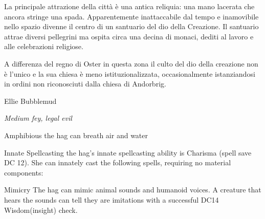 \documentclass[10pt,twoside, twocolumn, openany]{dndbook}
\begin{document}
La principale attrazione della città è una antica reliquia: una mano lacerata che ancora stringe una spada. Apparentemente inattaccabile dal tempo e inamovibile nello spazio divenne il centro di un santuario del dio della Creazione.
Il santuario attrae diversi pellegrini ma ospita circa una decina di monaci, dediti al lavoro e alle celebrazioni religiose.

A differenza del regno di Oster in questa zona il culto del dio della creazione non è l'unico e la sua chiesa è meno istituzionalizzata, occasionalmente istanziandosi in ordini non riconosciuti dalla chiesa di Andorbrig.


\begin{DndMonster}{Ellie Bubblemud} %
  \begin{hangingpar}
    \textit{Medium fey, legal evil}
  \end{hangingpar}
  \DndMonsterBasics[%
  armorclass = 17,
  hitpoints  = \DndDice{11d8 + 33},
  speed      = {30 ft.},
  ]
  \DndMonsterAbilityScores[
      str = 18, 
      dex = 12,
      con = 16,
      int = 13,
      wis = 14,
      cha = 14,
  ]
  \DndMonsterDetails[
    skills = {Arcana +3, Deception +4, Perception +4, Stealth +3},
    senses = {darkvision 60 ft., passive Perception 14},
    languages = {Common, Draconic, Sylvan},
    challenge = {3},
  ]

  \begin{DndMonsterAction}{Amphibious}
    the hag can breath air and water
  \end{DndMonsterAction}

  \begin{DndMonsterAction}{Innate Spellcasting}
    the hag's innate spellcasting ability is Charisma (spell save DC 12). She can innately cast the following spells, requiring no material components:
    \begin{DndMonsterSpells}
    \end{DndMonsterSpells}
  \end{DndMonsterAction}

  \begin{DndMonsterAction}{Mimicry}
    The hag can mimic animal sounds and humanoid voices. A creature that hears the sounds can tell they are imitations with a successful DC14 Wisdom(insight) check.
  \end{DndMonsterAction}


\end{DndMonster}
\end{document}
